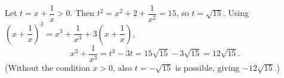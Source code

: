 Let $t=x+\dfrac{1}{x}>0$. Then $t^2=x^2+2+\dfrac{1}{x^2}=15$, so $t=\sqrt{15}$. Using $\left(x+\dfrac{1}{x}\right)^3=x^3+\dfrac{1}{x^3}+3\left(x+\dfrac{1}{x}\right)$,
\[
x^3+\dfrac{1}{x^3}=t^3-3t=15\sqrt{15}-3\sqrt{15}=\boxed{12\sqrt{15}}.
\]
(Without the condition $x>0$, also $t=-\sqrt{15}$ is possible, giving $-12\sqrt{15}$.)
